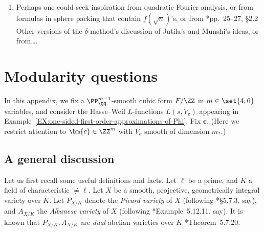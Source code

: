 \documentclass[12pt]{report}
\begin{document}
\begin{enumerate}[(1)]
    \item Perhaps one could seek inspiration
    from quadratic Fourier analysis,
    or from formulas in sphere packing that contain $f(\sqrt{n})$'s,
    or from
    \cite{kumaraswamy2018zeros}*{pp.~25--27, \S2.2 Other versions of the $\delta$-method}'s
    discussion of Jutila's and Munshi's ideas,
    or from\dots.
\end{enumerate}

\appendix

% 

\chapter{Modularity questions}
\label{CHAP:natural-modularity-questions}


In this appendix,
we fix a $\PP^{m-1}_\QQ$-smooth cubic form $F/\ZZ$ in $m\in\set{4,6}$ variables,
and consider the Hasse--Weil $L$-functions $L(s,V_{\bm{c}})$ appearing in Example~\ref{EX:one-sided-first-order-approximations-of-Phi}.
Fix $\bm{c}$.
(Here we restrict attention to $\bm{c}\in \ZZ^m$ with $V_{\bm{c}}$ smooth of dimension $m_\ast$.)

\section{A general discussion}

Let us first recall some useful definitions and facts.
Let $\ell$ be a prime,
and $K$ a field of characteristic $\neq \ell$.
Let $X$ be a smooth, projective, geometrically integral variety over $K$.
Let $P_{X/K}$ denote the \emph{Picard variety} of $X$ (following \cite{poonen2017rational}*{\S5.7.3}, say),
and $A_{X/K}$ the \emph{Albanese variety} of $X$ (following \cite{poonen2017rational}*{Example~5.12.11}, say).
It is known that $P_{X/K},A_{X/K}$ are \emph{dual} abelian varieties over $K$ \cite{poonen2017rational}*{Theorem~5.7.20}.
\end{document}
